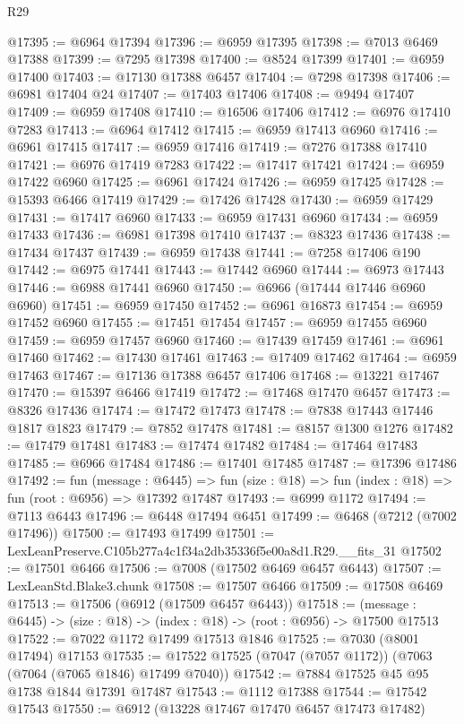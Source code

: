 \begin{lexlean}{R29}
\begin{coremodule}
@17395 := @6964 @17394
@17396 := @6959 @17395
@17398 := @7013 @6469 @17388
@17399 := @7295 @17398
@17400 := @8524 @17399
@17401 := @6959 @17400
@17403 := @17130 @17388 @6457
@17404 := @7298 @17398
@17406 := @6981 @17404 @24
@17407 := @17403 @17406
@17408 := @9494 @17407
@17409 := @6959 @17408
@17410 := @16506 @17406
@17412 := @6976 @17410 @7283
@17413 := @6964 @17412
@17415 := @6959 @17413 @6960
@17416 := @6961 @17415
@17417 := @6959 @17416
@17419 := @7276 @17388 @17410
@17421 := @6976 @17419 @7283
@17422 := @17417 @17421
@17424 := @6959 @17422 @6960
@17425 := @6961 @17424
@17426 := @6959 @17425
@17428 := @15393 @6466 @17419
@17429 := @17426 @17428
@17430 := @6959 @17429
@17431 := @17417 @6960
@17433 := @6959 @17431 @6960
@17434 := @6959 @17433
@17436 := @6981 @17398 @17410
@17437 := @8323 @17436
@17438 := @17434 @17437
@17439 := @6959 @17438
@17441 := @7258 @17406 @190
@17442 := @6975 @17441
@17443 := @17442 @6960
@17444 := @6973 @17443
@17446 := @6988 @17441 @6960
@17450 := @6966 (@17444 @17446 @6960 @6960)
@17451 := @6959 @17450
@17452 := @6961 @16873
@17454 := @6959 @17452 @6960
@17455 := @17451 @17454
@17457 := @6959 @17455 @6960
@17459 := @6959 @17457 @6960
@17460 := @17439 @17459
@17461 := @6961 @17460
@17462 := @17430 @17461
@17463 := @17409 @17462
@17464 := @6959 @17463
@17467 := @17136 @17388 @6457 @17406
@17468 := @13221 @17467
@17470 := @15397 @6466 @17419
@17472 := @17468 @17470 @6457
@17473 := @8326 @17436
@17474 := @17472 @17473
@17478 := @7838 @17443 @17446 @1817 @1823
@17479 := @7852 @17478
@17481 := @8157 @1300 @1276
@17482 := @17479 @17481
@17483 := @17474 @17482
@17484 := @17464 @17483
@17485 := @6966 @17484
@17486 := @17401 @17485
@17487 := @17396 @17486
@17492 := fun (message : @6445) =>
  fun (size : @18) => fun (index : @18) => fun (root : @6956) => @17392 @17487
@17493 := @6999 @1172
@17494 := @7113 @6443
@17496 := @6448 @17494 @6451
@17499 := @6468 (@7212 (@7002 @17496))
@17500 := @17493 @17499
@17501 := LexLeanPreserve.C105b277a4c1f34a2db35336f5e00a8d1.R29.__fits_31
@17502 := @17501 @6466
@17506 := @7008 (@17502 @6469 @6457 @6443)
@17507 := LexLeanStd.Blake3.chunk
@17508 := @17507 @6466
@17509 := @17508 @6469
@17513 := @17506 (@6912 (@17509 @6457 @6443))
@17518 := (message : @6445) -> (size : @18) -> (index : @18) -> (root : @6956) -> @17500 @17513
@17522 := @7022 @1172 @17499 @17513 @1846
@17525 := @7030 (@8001 @17494) @17153
@17535 := @17522 @17525 (@7047 (@7057 @1172)) (@7063 (@7064 (@7065 @1846) @17499 @7040))
@17542 := @7884 @17525 @45 @95 @1738 @1844 @17391 @17487
@17543 := @1112 @17388
@17544 := @17542 @17543
@17550 := @6912 (@13228 @17467 @17470 @6457 @17473 @17482)

\end{coremodule}
\end{lexlean}
